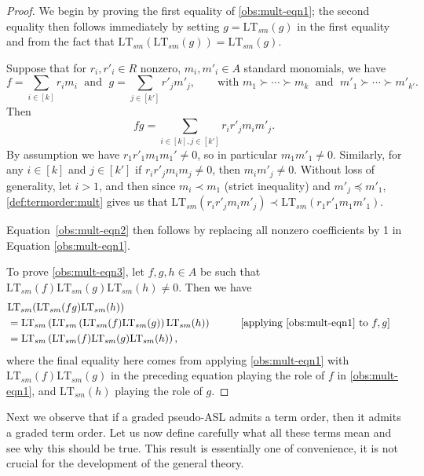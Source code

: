 \documentclass[11pt,reqno]{amsart}
\newcommand*{\eqcomment}[2][\qquad]{#1 &&\text{[#2]}}
\newcommand{\ltsm}{\text{LT}_{sm}}
\theoremstyle{definition}
\numberwithin{equation}{section}
\begin{document}
\begin{proof}
We begin by proving the first equality of \eqref{obs:mult-eqn1}; the second equality then follows immediately by setting $g = \ltsm(g)$ in the first equality and from the fact that $\ltsm(\ltsm(g)) = \ltsm(g)$.

Suppose that for $r_i, r'_i \in R$ nonzero, $m_i, m'_i \in A$ standard monomials, we have 
\[
f = \sum_{i \in [k]} r_i m_i \;\text{ and }\; g = \sum_{j \in [k']} r'_j m'_j, \qquad \text{with }m_1 \succ \dotsb \succ m_k \;\text{ and }\; m'_1 \succ \dotsb \succ m'_{k'}.
\] 
Then 
\[
fg = \sum_{i \in [k], j \in [k']} r_i r'_j m_i m'_j.
\] 
By assumption we have $r_1 r'_1 m_1 m_1' \neq 0$, so in particular $m_1 m'_1 \neq 0$. Similarly, for any $i \in [k]$ and $j \in [k']$ if $r_i r'_j m_i m_j \neq 0$, then $m_i m'_j \neq 0$. Without loss of generality, let $i > 1$, and then since $m_i \prec m_1$ (strict inequality) and $m'_j \preceq m'_1$, \ref{def:termorder:mult} gives us that $\ltsm(r_i r'_j m_i m'_j) \prec \ltsm(r_1 r'_1 m_1 m'_1)$.

Equation~\eqref{obs:mult-eqn2} then follows by replacing all nonzero coefficients by 1 in Equation \eqref{obs:mult-eqn1}.

To prove \eqref{obs:mult-eqn3}, let $f,g,h \in A$ be such that $\ltsm(f) \ltsm(g) \ltsm(h) \neq 0$.
Then we have
\begin{align*}
& \ltsm(\ltsm(fg) \ltsm(h)) \nonumber \\
& = \ltsm\left(\ltsm\left(\ltsm(f)\ltsm(g)\right) \ltsm(h)\right) \eqcomment{applying \eqref{obs:mult-eqn1} to $f,g$} \\
 & = \ltsm\left(\ltsm(f)\ltsm(g) \ltsm(h)\right),
\end{align*}
where the final equality here comes from applying \eqref{obs:mult-eqn1} with $\ltsm(f)\ltsm(g)$ in the preceding equation playing the role of $f$ in \eqref{obs:mult-eqn1}, and $\ltsm(h)$ playing the role of $g$.
\end{proof}

Next we observe that if a graded pseudo-ASL admits a term order, then it admits a graded term order. Let us now define carefully what all these terms mean and see why this should be true. This result is essentially one of convenience, it is not crucial for the development of the general theory. 
\end{document}
